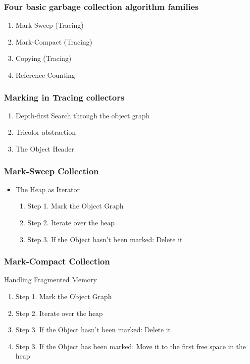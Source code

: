 \documentclass{beamer}
\begin{document}
\begin{frame}
  \frametitle{Four basic garbage collection algorithm families}
  \begin{enumerate}
    \item Mark-Sweep (Tracing)
    \item Mark-Compact (Tracing)
    \item Copying (Tracing)
    \item Reference Counting
  \end{enumerate}
\end{frame}

\begin{frame}
  \frametitle{Marking in Tracing collectors}
  \begin{enumerate}
    \item Depth-first Search through the object graph
    \item Tricolor abstraction
    \item The Object Header
  \end{enumerate}
\end{frame}

\begin{frame}
  \frametitle{Mark-Sweep Collection}
  \begin{itemize}
    \item The Heap as Iterator
    \begin{enumerate}
      \item Step 1. Mark the Object Graph
      \item Step 2. Iterate over the heap
      \item Step 3. If the Object hasn't been marked: Delete it
    \end{enumerate}
  \end{itemize}
\end{frame}

\begin{frame}
  \frametitle{Mark-Compact Collection}
  \item Handling Fragmented Memory
  \begin{enumerate}
    \item Step 1. Mark the Object Graph
    \item Step 2. Iterate over the heap
    \item Step 3. If the Object hasn't been marked: Delete it
    \item Step 3. If the Object has    been marked: Move it to the first free space in the heap
  \end{enumerate}
\end{frame}
\end{document}

